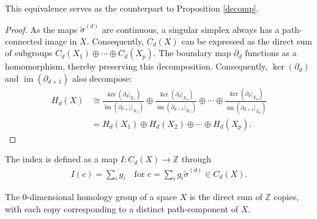 This equivalence serves as the counterpart to Proposition \ref{decomp}.

\begin{proof}
	As the maps \( \tilde{\sigma}^{(d)} \) are continuous, a singular simplex always has a path-connected image in \( X \). Consequently, \( C_{d}(X) \) can be expressed as the direct sum of subgroups \( C_{d}(X_{1}) \oplus \cdots \oplus C_{d}(X_{p}) \). The boundary map \( \partial_d \) functions as a homomorphism, thereby preserving this decomposition. Consequently, \( \ker(\partial_{d}) \) and \( \operatorname{im}(\partial_{d+1}) \) also decompose:
	\begin{align}
		H_{d}(X) &\cong \frac{\ker(\partial_{d}\vert_{X_1})}{\operatorname{im}(\partial_{d+1}\vert_{X_1})} \oplus \frac{\ker(\partial_{d}\vert_{X_2})}{\operatorname{im}(\partial_{d+1}\vert_{X_2})} \oplus \cdots \oplus \frac{\ker(\partial_{d}\vert_{X_p})}{\operatorname{im}(\partial_{d+1}\vert_{X_p})} \nonumber \\
				 &= H_{d}(X_{1}) \oplus H_{d}(X_{2}) \oplus \cdots \oplus H_{d}(X_{p}). 
	\end{align}
\end{proof}

\begin{definition}[Index]
	The index is defined as a map \( I: C_{d}(X) \to \mathbb{Z} \) through
	\begin{align}
		I(c) = \sum_{i} g_{i} \quad \text{for } c = \sum_{i} g_{i} \tilde{\sigma}^{(d)} \in C_{d}(X). 
	\end{align}
\end{definition}

\begin{proposition}
	The \( 0 \)-dimensional homology group of a space \( X \) is the direct sum of \(\mathbb{Z}\) copies, with each copy corresponding to a distinct path-component of \( X \).
\end{proposition}

